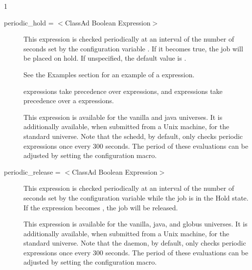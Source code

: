 \begin{ManPage}{\label{man-condor-submit}}{1}
\begin{description}

\item[periodic\_hold = $<$ClassAd Boolean Expression$>$]
This expression is checked periodically at an interval of
the number of seconds set by
the configuration variable .
If it becomes true, the job will be placed on hold.
If unspecified, the default value is .

See the Examples section for an example of a 
expression. 

 expressions take
precedence over  expressions,
and  expressions take
precedence over a  expressions.

This expression is available for the vanilla and java universes.
It is additionally available, when submitted from a Unix machine,
for the standard universe.  Note that the schedd, by default, only checks
periodic expressions once every 300 seconds.  The period of
these evaluations can be adjusted by setting the
 configuration macro.


\item[periodic\_release = $<$ClassAd Boolean Expression$>$]
This expression is checked periodically at an interval of
the number of seconds set by
the configuration variable 
while the job is in the Hold state.
If the expression becomes , the job will be released.

%

This expression is available for the vanilla, java, and globus universes.
It is additionally available, when submitted from a Unix machine,
for the standard universe.  Note that the  daemon,
by default, only checks
periodic expressions once every 300 seconds.  The period of
these evaluations can be adjusted by setting the
 configuration macro.



\end{description}
\end{ManPage}
